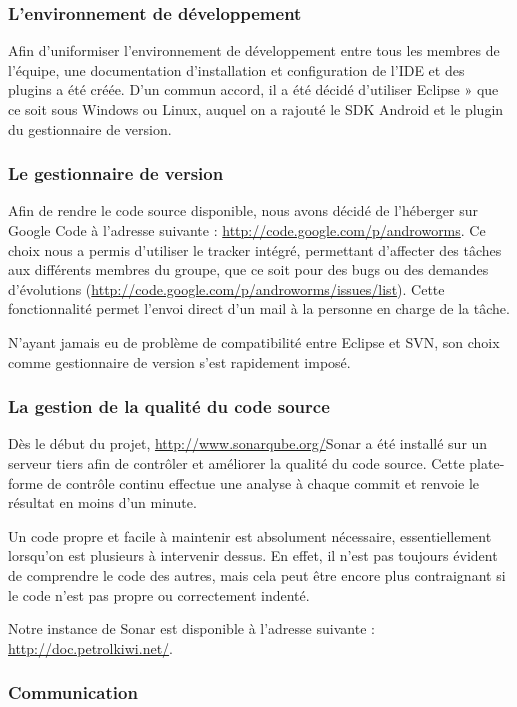 \documentclass{report}
\begin{document}
\subsubsection{L'environnement de développement}
Afin d’uniformiser l’environnement de développement entre tous les membres de l’équipe, une documentation d’installation et configuration de l’IDE et des plugins a été créée.
D’un commun accord, il a été décidé d’utiliser Eclipse » que ce soit sous Windows ou Linux, auquel on a rajouté le SDK Android et le plugin du gestionnaire de version.

\subsubsection{Le gestionnaire de version}

Afin de rendre le code source disponible, nous avons décidé de l’héberger sur Google Code à l’adresse suivante : \url{http://code.google.com/p/androworms}.
Ce choix nous a permis d’utiliser le tracker intégré, permettant d’affecter des tâches aux différents membres du groupe, que ce soit pour des bugs ou des demandes d’évolutions (\url{http://code.google.com/p/androworms/issues/list}). Cette fonctionnalité permet l’envoi direct d’un mail à la personne en charge de la tâche.

N’ayant jamais eu de problème de compatibilité entre Eclipse et SVN, son choix comme gestionnaire de version s’est rapidement imposé.

\subsubsection{La gestion de la qualité du code source}

Dès le début du projet, \url{http://www.sonarqube.org/}{Sonar} a été installé sur un serveur tiers afin de contrôler et améliorer la qualité du code source.
Cette plate-forme de contrôle continu effectue une analyse à chaque commit et renvoie le résultat en moins d’un minute.

Un code propre et facile à maintenir est absolument nécessaire, essentiellement lorsqu’on est plusieurs à intervenir dessus. En effet, il n’est pas toujours évident de comprendre le code des autres, mais cela peut être encore plus contraignant si le code n’est pas propre ou correctement indenté.

Notre instance de Sonar est disponible à l’adresse suivante : \url{http://doc.petrolkiwi.net/}.

\subsubsection{Communication}
\end{document}
